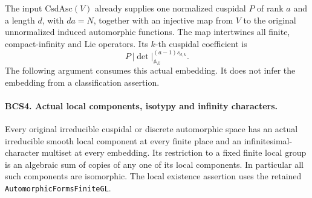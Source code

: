 \documentclass[11pt,a4paper]{article}
\numberwithin{equation}{section}
\theoremstyle{remark}\newtheorem{remark}[theorem]{Remark}
\begin{document}
The input \(\mathrm{CsdAsc}(V)\) already supplies one normalized
cuspidal \(P\) of rank \(a\) and a length \(d\), with
\(da=N\), together with an injective map from \(V\) to the
original unnormalized induced automorphic functions.  The map
intertwines all finite, compact-infinity and Lie operators.  Its
\(k\)-th cuspidal coefficient is
\[
                P\,|\det|_{\mathbb A_E}^{(a-1)s_{d,k}}.
 \tag{BCS.7}
\]
The following argument consumes this actual embedding.  It does not
infer the embedding from a classification assertion.

\paragraph{BCS4. Actual local components, isotypy and infinity characters.}
\label{claim:BCS4}
Every original irreducible cuspidal or discrete automorphic space
has an actual irreducible smooth local component at every finite
place and an infinitesimal-character multiset at every embedding.
Its restriction to a fixed finite local group is an algebraic sum
of copies of any one of its local components.  In particular all
such components are isomorphic.  The local existence assertion uses
the retained \texttt{Automorphic\allowbreak Forms\allowbreak Finite\allowbreak GL}.
\end{document}
